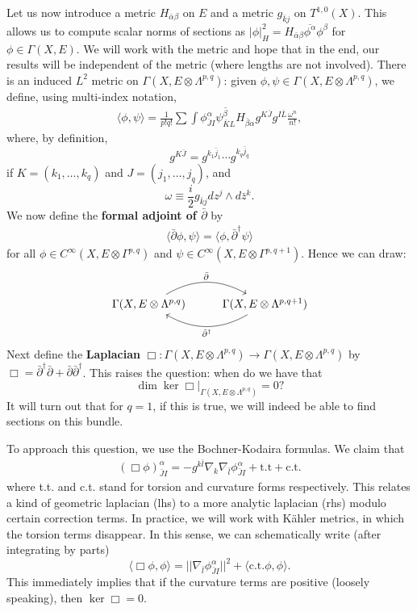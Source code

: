 \documentclass{../mathnotes}
\begin{document}
Let us now introduce a metric $H_{\bar\alpha\beta}$ on $E$ and a metric $g_{\bar kj}$ on $T^{1,0}(X)$.
This allows us to compute scalar norms of sections as $|\phi|^2_H=H_{\bar\alpha\beta}\overline{\phi^\alpha}\phi^\beta$ for $\phi\in\Gamma(X,E)$.
We will work with the metric and hope that in the end, our results will be independent of the metric (where lengths are not involved).
There is an induced $L^2$ metric on $\Gamma(X,E\otimes \Lambda^{p,q})$: given $\phi,\psi\in\Gamma(X,E\otimes\Lambda^{p,q})$, we define, using
multi-index notation,
\begin{align*}
    \langle \phi,\psi\rangle = \frac{1}{p!q!}\sum\int \phi^\alpha_{\bar JI}\overline{\psi^\beta_{\bar KL}}H_{\bar\beta\alpha}g^{K\bar J}g^{I\bar L}\frac{\omega^n}{n!},
\end{align*}
where, by definition,
\[g^{K\bar J}=g^{k_1\bar j_1}\cdots g^{k_q\bar j_q}\]
if $K=(k_1,\ldots, k_q)$ and $J=(j_1,\ldots,j_q)$,
and
\[\omega\equiv \frac{i}{2}g_{\bar kj}dz^j\wedge d\bar z^k.\]
We now define the \textbf{formal adjoint of $\bar\partial$} by
\begin{align*}
    \langle \bar\partial \phi,\psi\rangle =\langle\phi,\bar\partial^\dagger\psi\rangle
\end{align*}
for all $\phi\in C^\infty(X,E\otimes\Gamma^{p,q})$ and $\psi\in C^\infty(X,E\otimes\Gamma^{p,q+1})$.
Hence we can draw:
\begin{equation*}
    \begin{tikzcd}
        \Gamma(X,E\otimes\Lambda^{p,q})\arrow[bend left]{r}{\bar\partial} & \Gamma(X,E\otimes\Lambda^{p,q+1})\arrow[bend left]{l}{\bar\partial^\dagger}
    \end{tikzcd}
\end{equation*}
Next define the \textbf{Laplacian} $\Box:\Gamma(X,E\otimes\Lambda^{p,q})\to\Gamma(X,E\otimes\Lambda^{p,q})$ by $\Box=\bar\partial^\dagger\bar\partial+\bar\partial\bar\partial^\dagger$.
This raises the question: when do we have that
\[\dim\ker\Box\bigg|_{\Gamma(X,E\otimes\Lambda^{p,q})}=0?\]
It will turn out that for $q=1$, if this is true, we will indeed be able to find sections on this bundle.

To approach this question, we use the Bochner-Kodaira formulas. We claim that
\begin{align*}
    (\Box\phi)^\alpha_{\bar JI}=-g^{k\bar l}\nabla_k\nabla_{\bar l}\phi^\alpha_{\bar JI}+\text{t.t} + \text{c.t.}
\end{align*}
where t.t. and c.t. stand for torsion and curvature forms respectively. This relates a kind of geometric laplacian (lhs) to a
more analytic laplacian (rhs) modulo certain correction terms. In practice, we will work with K\"ahler metrics, in which
the torsion terms disappear. In this sense, we can schematically write (after integrating by parts)
\[\langle \Box\phi,\phi\rangle=||\nabla_{\bar l}\phi_{\bar J I}^\alpha||^2+\langle\text{c.t.}\phi,\phi\rangle.\]
This immediately implies that if the curvature terms are positive (loosely speaking), then $\ker\Box=0$.
\end{document}
